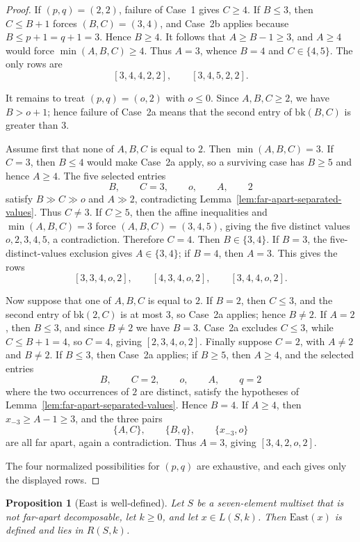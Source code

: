 \documentclass[11pt]{article}
\theoremstyle{plain}
\newtheorem{proposition}[theorem]{Proposition}
\theoremstyle{definition}
\theoremstyle{remark}
\begin{document}
\begin{proof}
If \((p,q)=(2,2)\), failure of Case~1 gives \(C\ge 4\). If \(B\le 3\), then
\(C\le B+1\) forces \((B,C)=(3,4)\), and Case~2b applies because
\(B\le p+1=q+1=3\). Hence \(B\ge 4\). It follows that \(A\ge B-1\ge 3\), and
\(A\ge 4\) would force \(\min(A,B,C)\ge 4\). Thus \(A=3\), whence
\(B=4\) and \(C\in\{4,5\}\). The only rows are
\[
  [3,4,4,2,2],\qquad [3,4,5,2,2].
\]

It remains to treat \((p,q)=(o,2)\) with \(o\le 0\). Since \(A,B,C\ge 2\), we
have \(B>o+1\); hence failure of Case~2a means that the second entry of
\(\mathrm{bk}(B,C)\) is greater than \(3\).

Assume first that none of \(A,B,C\) is equal to \(2\). Then
\(\min(A,B,C)=3\). If \(C=3\), then \(B\le 4\) would make Case~2a apply, so a
surviving case has \(B\ge 5\) and hence \(A\ge 4\). The five selected entries
\[
  B,
  \qquad C=3,
  \qquad o,
  \qquad A,
  \qquad 2
\]
satisfy \(B\gg C\gg o\) and \(A\gg 2\), contradicting
Lemma~\ref{lem:far-apart-separated-values}. Thus \(C\ne 3\). If \(C\ge 5\),
then the affine inequalities and \(\min(A,B,C)=3\) force
\((A,B,C)=(3,4,5)\), giving the five distinct values \(o,2,3,4,5\), a
contradiction. Therefore \(C=4\). Then \(B\in\{3,4\}\). If \(B=3\), the
five-distinct-values exclusion gives \(A\in\{3,4\}\); if \(B=4\), then
\(A=3\). This gives the rows
\[
  [3,3,4,o,2],
  \qquad [4,3,4,o,2],
  \qquad [3,4,4,o,2].
\]

Now suppose that one of \(A,B,C\) is equal to \(2\). If \(B=2\), then
\(C\le 3\), and the second entry of \(\mathrm{bk}(2,C)\) is at most \(3\), so
Case~2a applies; hence \(B\ne 2\). If \(A=2\), then \(B\le 3\), and since
\(B\ne 2\) we have \(B=3\). Case~2a excludes \(C\le 3\), while
\(C\le B+1=4\), so \(C=4\), giving \([2,3,4,o,2]\). Finally suppose
\(C=2\), with \(A\ne 2\) and \(B\ne 2\). If \(B\le 3\), then Case~2a applies;
if \(B\ge 5\), then \(A\ge 4\), and the selected entries
\[
  B,
  \qquad C=2,
  \qquad o,
  \qquad A,
  \qquad q=2
\]
where the two occurrences of \(2\) are distinct, satisfy the hypotheses of
Lemma~\ref{lem:far-apart-separated-values}. Hence \(B=4\). If \(A\ge 4\), then
\(x_{-3}\ge A-1\ge 3\), and the three pairs
\[
  \{A,C\},
  \qquad \{B,q\},
  \qquad \{x_{-3},o\}
\]
are all far apart, again a contradiction. Thus \(A=3\), giving
\([3,4,2,o,2]\).

The four normalized possibilities for \((p,q)\) are exhaustive, and each gives
only the displayed rows.
\end{proof}

\begin{proposition}[East is well-defined]
\label{prop:east-well-defined}
Let \(S\) be a seven-element multiset that is not far-apart decomposable, let
\(k\ge 0\), and let \(x\in L(S,k)\). Then \(\mathrm{East}(x)\) is defined and
lies in \(R(S,k)\).
\end{proposition}
\end{document}
